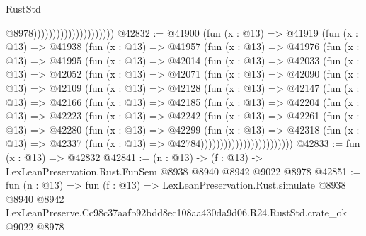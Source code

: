 \begin{lexlean}{RustStd}
\begin{coremodule}
                                              @8978)))))))))))))))))))))
@42832 := @41900
    (fun (x : @13) =>
    @41919
      (fun (x : @13) =>
      @41938
        (fun (x : @13) =>
        @41957
          (fun (x : @13) =>
          @41976
            (fun (x : @13) =>
            @41995
              (fun (x : @13) =>
              @42014
                (fun (x : @13) =>
                @42033
                  (fun (x : @13) =>
                  @42052
                    (fun (x : @13) =>
                    @42071
                      (fun (x : @13) =>
                      @42090
                        (fun (x : @13) =>
                        @42109
                          (fun (x : @13) =>
                          @42128
                            (fun (x : @13) =>
                            @42147
                              (fun (x : @13) =>
                              @42166
                                (fun (x : @13) =>
                                @42185
                                  (fun (x : @13) =>
                                  @42204
                                    (fun (x : @13) =>
                                    @42223
                                      (fun (x : @13) =>
                                      @42242
                                        (fun (x : @13) =>
                                        @42261
                                          (fun (x : @13) =>
                                          @42280
                                            (fun (x : @13) =>
                                            @42299
                                              (fun (x : @13) =>
                                              @42318
                                                (fun (x : @13) =>
                                                @42337
                                                  (fun (x : @13) => @42784))))))))))))))))))))))))
@42833 := fun (x : @13) => @42832
@42841 := (n : @13) -> (f : @13) -> LexLeanPreservation.Rust.FunSem @8938 @8940 @8942 @9022 @8978
@42851 := fun (n : @13) =>
  fun (f : @13) =>
  LexLeanPreservation.Rust.simulate
    @8938
    @8940
    @8942
    LexLeanPreserve.Cc98c37aafb92bdd8ec108aa430da9d06.R24.RustStd.crate_ok
    @9022
    @8978
\end{coremodule}
\end{lexlean}
